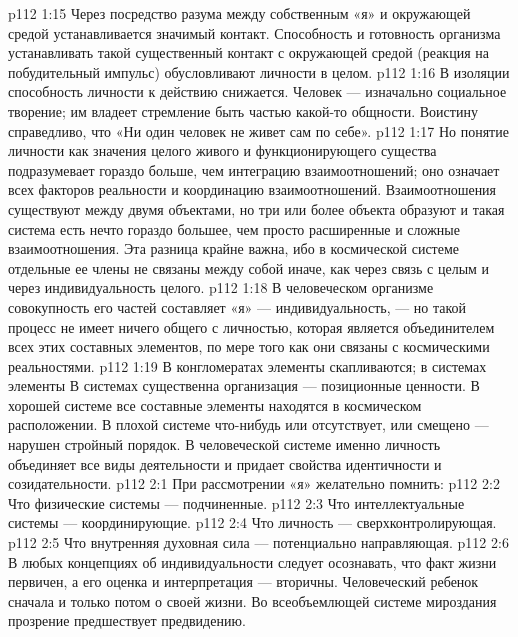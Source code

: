 \vs p112 1:15 Через посредство разума между собственным «я» и окружающей средой устанавливается значимый контакт. Способность и готовность организма устанавливать такой существенный контакт с окружающей средой (реакция на побудительный импульс) обусловливают  личности в целом.
\vs p112 1:16 В изоляции способность личности к действию снижается. Человек --- изначально социальное творение; им владеет стремление быть частью какой\hyp{}то общности. Воистину справедливо, что «Ни один человек не живет сам по себе».
\vs p112 1:17 Но понятие личности как значения целого живого и функционирующего существа подразумевает гораздо больше, чем интеграцию взаимоотношений; оно означает  всех факторов реальности и координацию взаимоотношений. Взаимоотношения существуют между двумя объектами, но три или более объекта образуют  и такая система есть нечто гораздо большее, чем просто расширенные и сложные взаимоотношения. Эта разница крайне важна, ибо в космической системе отдельные ее члены не связаны между собой иначе, как через связь с целым и через индивидуальность целого.
\vs p112 1:18 В человеческом организме совокупность его частей составляет «я» --- индивидуальность, --- но такой процесс не имеет ничего общего с личностью, которая является объединителем всех этих составных элементов, по мере того как они связаны с космическими реальностями.
\vs p112 1:19 В конгломератах элементы скапливаются; в системах элементы  В системах существенна организация --- позиционные ценности. В хорошей системе все составные элементы находятся в космическом расположении. В плохой системе что\hyp{}нибудь или отсутствует, или смещено --- нарушен стройный порядок. В человеческой системе именно личность объединяет все виды деятельности и придает свойства идентичности и созидательности.
\vs p112 2:1 При рассмотрении «я» желательно помнить:
\vs p112 2:2 \bibnobreakspace Что физические системы --- подчиненные.
\vs p112 2:3 \bibnobreakspace Что интеллектуальные системы --- координирующие.
\vs p112 2:4 \bibnobreakspace Что личность --- сверхконтролирующая.
\vs p112 2:5 \bibnobreakspace Что внутренняя духовная сила --- потенциально направляющая.
\vs p112 2:6 \pc В любых концепциях об индивидуальности следует осознавать, что факт жизни первичен, а его оценка и интерпретация --- вторичны. Человеческий ребенок сначала  и только потом  о своей жизни. Во всеобъемлющей системе мироздания прозрение предшествует предвидению.
